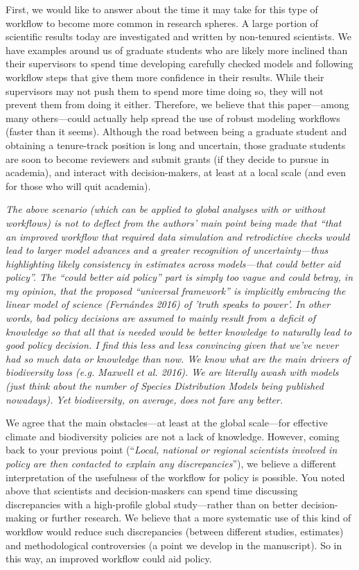 \documentclass[11pt,letter]{article}
\begin{document}
First, we would like to answer about the time it may take for this type of workflow to become more common in research spheres. A large portion of scientific results today are investigated and written by non-tenured scientists. We have examples around us of graduate students who are likely more inclined than their supervisors to spend time developing carefully checked models and following workflow steps that give them more confidence in their results. While their supervisors may not push them to spend more time doing so, they will not prevent them from doing it either. Therefore, we believe that this paper---among many others---could actually help spread the use of robust modeling workflows (faster than it seems). Although the road between being a graduate student and obtaining a tenure-track position is long and uncertain, those graduate students are soon to become reviewers and submit grants (if they decide to pursue in academia), and interact with decision-makers, at least at a local scale (and even for those who will quit academia). 

\begin{mybox}
\emph{The above scenario (which can be applied to global analyses with or without workflows) is not
to deflect from the authors' main point being made that “that an improved workflow that
required data simulation and retrodictive checks would lead to larger model advances and a
greater recognition of uncertainty—thus highlighting likely consistency in estimates across
models—that could better aid policy”. The “could better aid policy” part is simply too vague
and could betray, in my opinion, that the proposed “universal framework” is implicitly
embracing the linear model of science (Fernándes 2016) of 'truth speaks to power'. In other
words, bad policy decisions are assumed to mainly result from a deficit of knowledge so that
all that is needed would be better knowledge to naturally lead to good policy decision. I find
this less and less convincing given that we’ve never had so much data or knowledge than now.
We know what are the main drivers of biodiversity loss (e.g. Maxwell et al. 2016). We are
literally awash with models (just think about the number of Species Distribution Models being
published nowadays). Yet biodiversity, on average, does not fare any better.}  
\end{mybox}

We agree that the main obstacles---at least at the global scale---for effective climate and biodiversity policies are not a lack of knowledge. However, coming back to your previous point (``\emph{Local, national or regional scientists involved in policy are then contacted to explain any discrepancies}''), we believe a different interpretation of the usefulness of the workflow for policy is possible. You noted above that scientists and decision-maskers can spend time discussing discrepancies with a high-profile global study---rather than on better decision-making or further research. We believe that a more systematic use of this kind of workflow would reduce such discrepancies (between different studies, estimates) and methodological controversies (a point we develop in the manuscript). So in this way, an improved workflow could aid policy.
\end{document}
